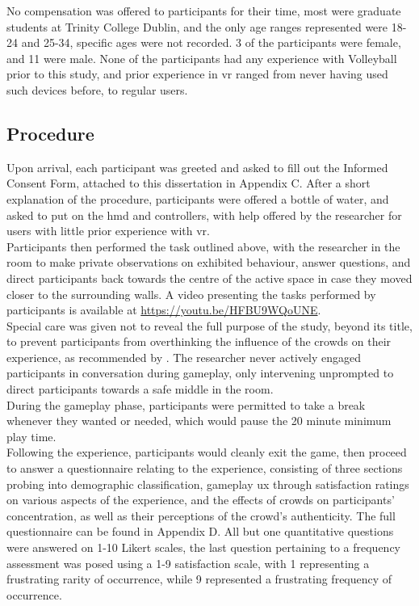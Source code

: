 No compensation was offered to participants for their time, most were graduate students at Trinity College Dublin, and the only age ranges represented were 18-24 and 25-34, specific ages were not recorded. 3 of the participants were female, and 11 were male. None of the participants had any experience with Volleyball prior to this study, and prior experience in \gls{vr} ranged from never having used such devices before, to regular users.\\

\subsection{Procedure}

Upon arrival, each participant was greeted and asked to fill out the Informed Consent Form, attached to this dissertation in Appendix C. After a short explanation of the procedure, participants were offered a bottle of water, and asked to put on the \gls{hmd} and controllers, with help offered by the researcher for users with little prior experience with \gls{vr}.\\

Participants then performed the task outlined above, with the researcher in the room to make private observations on exhibited behaviour, answer questions, and direct participants back towards the centre of the active space in case they moved closer to the surrounding walls. A video presenting the tasks performed by participants is available at \url{https://youtu.be/HFBU9WQoUNE}.\\
Special care was given not to reveal the full purpose of the study, beyond its title, to prevent participants from overthinking the influence of the crowds on their experience, as recommended by \cite{murcia-2020-evaluating}. The researcher never actively engaged participants in conversation during gameplay, only intervening unprompted to direct participants towards a safe middle in the room.\\
During the gameplay phase, participants were permitted to take a break whenever they wanted or needed, which would pause the 20 minute minimum play time.\\

Following the experience, participants would cleanly exit the game, then proceed to answer a questionnaire relating to the experience, consisting of three sections probing into demographic classification, gameplay \gls{ux} through satisfaction ratings on various aspects of the experience, and the effects of crowds on participants' concentration, as well as their perceptions of the crowd's authenticity. The full questionnaire can be found in Appendix D. All but one quantitative questions were answered on 1-10 Likert scales, the last question pertaining to a frequency assessment was posed using a 1-9 satisfaction scale, with 1 representing a frustrating rarity of occurrence, while 9 represented a frustrating frequency of occurrence.\\

